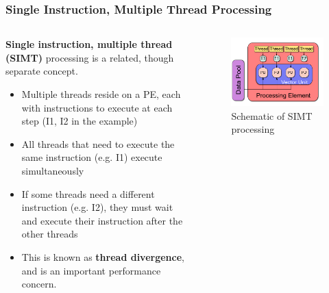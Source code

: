 \documentclass{beamer}
\begin{document}
\begin{frame}
 \frametitle{Single Instruction, Multiple Thread Processing}
 \begin{columns}
 \begin{column}{0.6\textwidth}
 \textbf{Single instruction, multiple thread (SIMT)} processing is a related, though separate concept.
 \begin{itemize}
  \item Multiple threads reside on a PE, each with instructions to execute at each step (\textrm{I1}, \textrm{I2} in the example)
  \item All threads that need to execute the same instruction (e.g. \textrm{I1}) execute simultaneously
  \item If some threads need a different instruction (e.g. \textrm{I2}), they must wait and execute their instruction after the other threads
  \item This is known as \textbf{thread divergence}, and is an important performance concern.
 \end{itemize}
 \end{column}
 \begin{column}{0.4\textwidth}
  \begin{figure}[r]
    \centering
    \includegraphics[width=\columnwidth]{SIMT.pdf}
    \caption{Schematic of SIMT processing}
  \end{figure}
 \end{column}
 \end{columns}
\end{frame}
\end{document}
